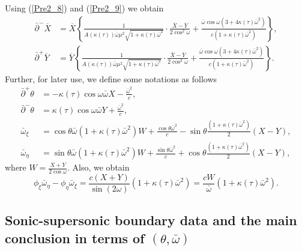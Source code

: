 \documentclass[3p,11pt]{elsarticle}
\numberwithin{equation}{section}
\begin{document}
Using (\ref{Pre2_8}) and (\ref{Pre2_9}) we obtain 
\begin{equation}\label{Pre2_10}
    \begin{split}
        \bar\partial^- \overline X &= \overline X \left\{ \frac{1}{A(\kappa(\tau))\bar\omega \mu^2  \sqrt{1+\kappa(\tau)\bar\omega^2}} \cdot \frac{ \overline X- \overline Y}{2\cos^2\omega}+\frac{\bar\omega\cos\omega(3+4\kappa(\tau)\bar\omega^2)}{c(1+\kappa(\tau)\bar\omega^2)}\right \},\\
       \bar\partial^+ \overline Y &= \overline Y \left\{ \frac{1}{A(\kappa(\tau))\bar\omega  \mu^2\sqrt{1+\kappa(\tau)\bar\omega^2}} \cdot \frac{ \overline X- \overline Y}{2\cos^2\omega}+\frac{\bar\omega\cos\omega(3+4\kappa(\tau)\bar\omega^2)}{c(1+\kappa(\tau)\bar\omega^2)}\right \}.
    \end{split}
\end{equation}  
Further, for later use, we define some notations as follows
\begin{equation}\label{Pre2_11}
    \begin{split}
        \bar\partial^+\theta &= -\kappa(\tau)\cos\omega\bar\omega X-\frac{\bar\omega^2}{c},\\
        \bar\partial^-\theta &= \kappa(\tau)\cos\omega\bar\omega Y
        +\frac{\bar\omega^2}{c},\\
        \bar\omega_\xi &=\cos\theta\bar\omega(1+\kappa(\tau)\bar\omega^2){W}+\frac{\cos\theta\bar\omega^2}{c}-\sin\theta\frac{(1+\kappa(\tau)\bar\omega^2)}{2}( X- Y),\\
        \bar\omega_\eta &=\sin\theta\bar\omega(1+\kappa(\tau)\bar\omega^2){W}+\frac{\sin\theta\bar\omega^2}{c}+\cos\theta\frac{(1+\kappa(\tau)\bar\omega^2)}{2}( X- Y),
    \end{split}
\end{equation}
where ${W} =\frac{X+ Y}{2\cos\omega}$.
Also, we obtain 
\begin{equation}\label{Pre2_12}
    \phi_\xi\bar\omega_\eta-\phi_\eta\bar\omega_\xi =\frac{c({X}+{ Y})}{\sin(2\omega)}(1+\kappa(\tau)\bar\omega^2)=\frac{cW}{\bar\omega}(1+\kappa(\tau)\bar\omega^2).
\end{equation}

\subsection{Sonic-supersonic boundary data and the main conclusion in terms of $(\theta, \bar\omega)$}
\end{document}
